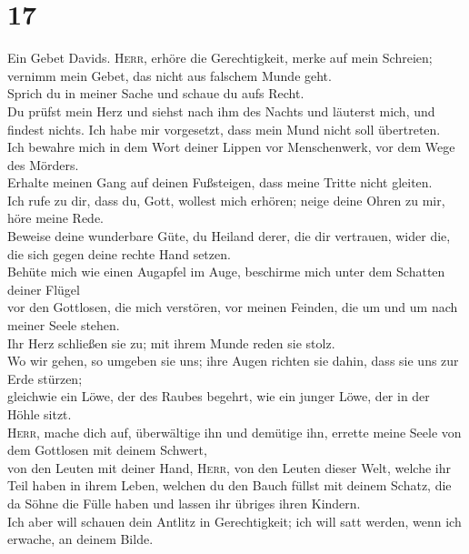 \hypertarget{section-16}{%
\section{17}\label{section-16}}

 Ein Gebet Davids. \textsc{Herr}, erhöre die
Gerechtigkeit, merke auf mein Schreien; vernimm mein Gebet, das nicht
aus falschem Munde geht.\\
 Sprich du in meiner Sache und schaue du aufs Recht.\\
 Du prüfst mein Herz und siehst nach ihm des Nachts und
läuterst mich, und findest nichts. Ich habe mir vorgesetzt, dass mein
Mund nicht soll übertreten.\\
 Ich bewahre mich in dem Wort deiner Lippen vor
Menschenwerk, vor dem Wege des Mörders.\\
 Erhalte meinen Gang auf deinen Fußsteigen, dass meine
Tritte nicht gleiten.\\
 Ich rufe zu dir, dass du, Gott, wollest mich erhören;
neige deine Ohren zu mir, höre meine Rede.\\
 Beweise deine wunderbare Güte, du Heiland derer, die dir
vertrauen, wider die, die sich gegen deine rechte Hand setzen.\\
 Behüte mich wie einen Augapfel im Auge, beschirme mich
unter dem Schatten deiner Flügel\\
 vor den Gottlosen, die mich verstören, vor meinen
Feinden, die um und um nach meiner Seele stehen.\\
 Ihr Herz schließen sie zu; mit ihrem Munde reden sie
stolz.\\
 Wo wir gehen, so umgeben sie uns; ihre Augen richten sie
dahin, dass sie uns zur Erde stürzen;\\
 gleichwie ein Löwe, der des Raubes begehrt, wie ein
junger Löwe, der in der Höhle sitzt.\\
 \textsc{Herr}, mache dich auf, überwältige ihn und
demütige ihn, errette meine Seele von dem Gottlosen mit deinem
Schwert,\\
 von den Leuten mit deiner Hand, \textsc{Herr}, von den
Leuten dieser Welt, welche ihr Teil haben in ihrem Leben, welchen du den
Bauch füllst mit deinem Schatz, die da Söhne die Fülle haben und lassen
ihr übriges ihren Kindern.\\
 Ich aber will schauen dein Antlitz in Gerechtigkeit; ich
will satt werden, wenn ich erwache, an deinem Bilde.

